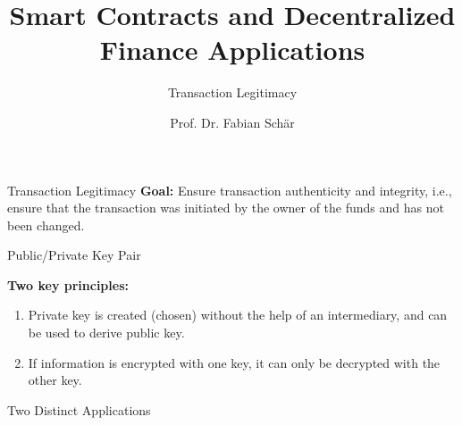\documentclass[handout]{beamer}
\title{Smart Contracts and Decentralized Finance Applications}
\subtitle{Transaction Legitimacy}
\author{Prof. Dr. Fabian Schär}
\institute{University of Basel}
\begin{document}
\thispagestyle{empty}
\begin{frame}[noframenumbering]
	\titlepage
\end{frame}

\begin{frame}{Transaction Legitimacy}
\textbf{Goal:} Ensure transaction \color{focus}authenticity \color{black}and \color{focus} integrity\color{black}, i.e., ensure that the transaction was initiated by the owner of the funds and has not been changed.
\uncover<2->{
		\center
		
		}
\uncover<3->{
		\vspace{2em}
		
	}
\end{frame}

\begin{frame}{Public/Private Key Pair}

	

\vspace{1em}

\textbf{Two key principles:}
\begin{enumerate}
\item<1-> Private key is created (chosen) without the help of an intermediary, and can be used to derive public key.
\item<2-> If information is encrypted with one key, it can only be decrypted with the other key.
\end{enumerate}

\vspace{1.5em}

\end{frame}

\begin{frame}{Two Distinct Applications}
	
\end{frame}
\end{document}
